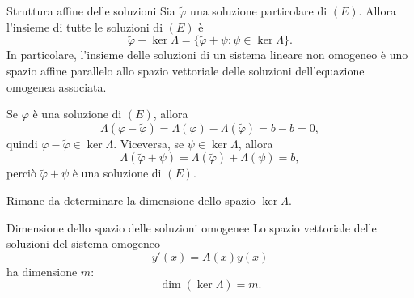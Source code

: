 \documentclass[a4paper]{article}
\begin{document}
\begin{radioactive}
\begin{snippetproposition}{Struttura affine delle soluzioni}
Sia \(\widetilde\varphi\) una soluzione particolare di \((E)\). Allora l'insieme di tutte le soluzioni di \((E)\) è
\[
	\widetilde\varphi+\ker\Lambda
	=
	\bigl\{\widetilde\varphi+\psi:\psi\in\ker\Lambda\bigr\}.
\]
In particolare, l'insieme delle soluzioni di un sistema lineare non omogeneo è uno spazio affine parallelo allo spazio vettoriale delle soluzioni dell'equazione omogenea associata.
\end{snippetproposition}
\end{radioactive}

\begin{radioactive}
\begin{snippetproof}{}
Se \(\varphi\) è una soluzione di \((E)\), allora
\[
	\Lambda(\varphi-\widetilde\varphi)
	=\Lambda(\varphi)-\Lambda(\widetilde\varphi)
	=b-b=0,
\]
quindi \(\varphi-\widetilde\varphi\in\ker\Lambda\). Viceversa, se \(\psi\in\ker\Lambda\), allora
\[
	\Lambda(\widetilde\varphi+\psi)
	=\Lambda(\widetilde\varphi)+\Lambda(\psi)
	=b,
\]
perciò \(\widetilde\varphi+\psi\) è una soluzione di \((E)\).
\end{snippetproof}
\end{radioactive}

\begin{radioactive}
Rimane da determinare la dimensione dello spazio \(\ker\Lambda\).
\end{radioactive}

\begin{radioactive}
\begin{snippettheorem}{Dimensione dello spazio delle soluzioni omogenee}
Lo spazio vettoriale delle soluzioni del sistema omogeneo
\[
	y'(x)=A(x)y(x)
\]
ha dimensione \(m\):
\[
	\dim(\ker\Lambda)=m.
\]
\end{snippettheorem}
\end{radioactive}
\end{document}
